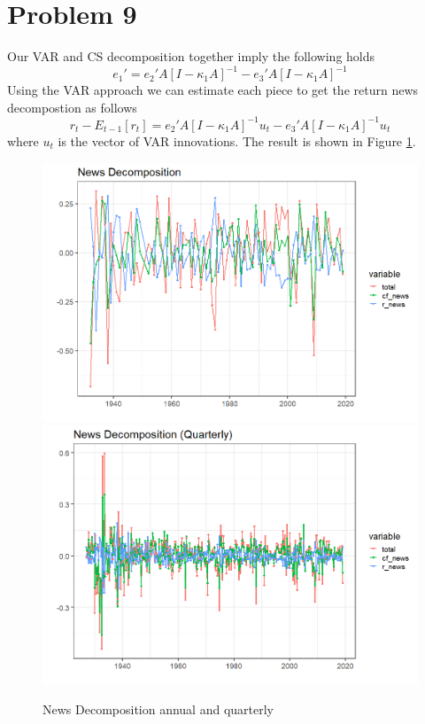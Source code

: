 \documentclass[11pt,letter]{article}
\begin{document}
\section*{Problem 9}
Our VAR and CS decomposition together imply the following holds
\begin{equation}
	e_1' = e_2'A\left[I - \kappa_1A\right]^{-1} - e_3'A\left[I - \kappa_1 A\right]^{-1}
\end{equation}
Using the VAR approach we can estimate each piece to get the return news decompostion as follows
\begin{equation*}
	r_t - E_{t-1}\left[r_t\right] = e_2'A\left[I - \kappa_1A\right]^{-1}u_t - e_3'A\left[I - \kappa_1 A\right]^{-1}u_t
\end{equation*}
where $u_t$ is the vector of VAR innovations. The result is shown in Figure \ref{fig:news_decomposition}.
\begin{figure}[!htb]
	\centering
	\includegraphics[scale = 0.5]{news_decomposition.png}
	\includegraphics[scale = 0.5]{news_decomp_qrtly.png}
	\caption{News Decomposition annual and quarterly}
	\label{fig:news_decomposition}
\end{figure}
\end{document}
